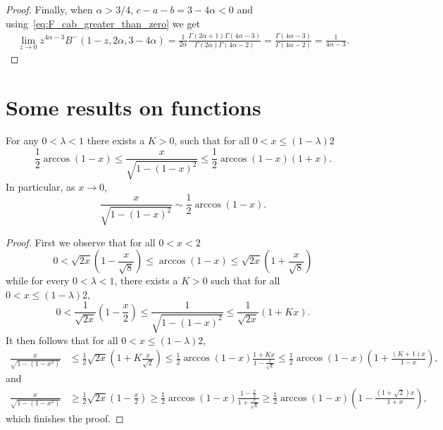 \begin{appendices}
\begin{proof}
Finally, when $\alpha > 3/4$, $c - a - b = 3 - 4\alpha < 0$ and using~\eqref{eq:F_cab_greater_than_zero} we get
\begin{align*}
	\lim_{z \to 0} z^{4\alpha - 3} B^-(1-z, 2\alpha, 3-4\alpha ) 
	= \frac{1}{2\alpha}\frac{\Gamma(2\alpha + 1)\Gamma(4\alpha - 3)}{\Gamma(2\alpha)\Gamma(4\alpha - 2)}
	= \frac{\Gamma(4\alpha - 3)}{\Gamma(4\alpha - 2)} = \frac{1}{4\alpha - 3}.
\end{align*}
\end{proof}

\section{Some results on functions}

\begin{lemma}\label{lem:arccos_approx}
For any $0 < \lambda < 1$ there exists a $K > 0$, such that for all $0 < x \le (1 - \lambda)2$
\[
	\frac{1}{2}\arccos(1-x)
	\le \frac{x}{\sqrt{1-(1-x)^2}} 
	\le \frac{1}{2}\arccos(1-x)\left(1 + x\right).
\]
In particular, as $x \to 0$,
\[
	\frac{x}{\sqrt{1-(1-x)^2}} \sim \frac{1}{2}\arccos(1-x).
\]
\end{lemma}

\begin{proof}
First we observe that for all $0 < x < 2$
\[
	0 < \sqrt{2x}\left(1 - \frac{x}{\sqrt{8}}\right) \le \arccos(1-x) \le 
	\sqrt{2x}\left(1 + \frac{x}{\sqrt{8}}\right)
\]
while for every $0 < \lambda < 1$, there exists a $K > 0$ such that for all $0 < x \le (1-\lambda) 2$,
\[
	0 < \frac{1}{\sqrt{2x}}\left(1 - \frac{x}{2}\right) \le \frac{1}{\sqrt{1 - (1 - x)^2}} \le
	\frac{1}{\sqrt{2x}}\left(1 + K x\right).
\]
It then follows that for all $0 < x \le (1-\lambda) 2$,
\begin{align*}
	\frac{x}{\sqrt{1 - (1-x^2)}} &\le \frac{1}{2} \sqrt{2x}\left(1 + K\frac{x}{\sqrt{2}}\right)
		\le \frac{1}{2} \arccos(1-x) \frac{1 + Kx}{1 - \frac{x}{\sqrt{8}}}
		\le \frac{1}{2} \arccos(1-x)\left(1 + \frac{(K + 1)x}{1 - x}\right),
\end{align*}
and
\begin{align*}
	\frac{x}{\sqrt{1 - (1-x^2)}} &\ge \frac{1}{2} \sqrt{2x}\left(1 - \frac{x}{2}\right)
		\ge \frac{1}{2} \arccos(1-x) \frac{1 - \frac{x}{2}}{1 + \frac{x}{\sqrt{8}}}
		\ge \frac{1}{2} \arccos(1-x)\left(1 - \frac{(1+\sqrt{2})x}{1 + x}\right),
\end{align*}
which finishes the proof.
\end{proof}


\end{appendices}
